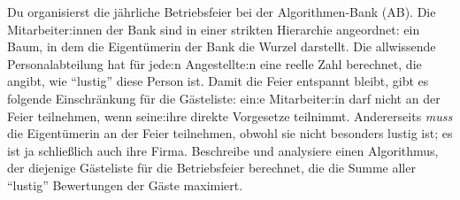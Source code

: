 \documentclass{uebung_cs}
\begin{document}
\begin{aufgabe}[Betriebsfeier]
    Du organisierst die jährliche Betriebsfeier bei der Algorithmen-Bank (AB).
    Die Mitarbeiter:innen der Bank sind in einer strikten Hierarchie angeordnet: ein Baum, in dem die Eigentümerin der Bank die Wurzel darstellt.
    Die allwissende Personalabteilung hat für jede:n Angestellte:n eine reelle Zahl berechnet, die angibt, wie \enquote{lustig} diese Person ist.
    Damit die Feier entspannt bleibt, gibt es folgende Einschränkung für die Gästeliste:
    ein:e Mitarbeiter:in darf nicht an der Feier teilnehmen, wenn seine:ihre direkte Vorgesetze teilnimmt.
    Andererseits \emph{muss} die Eigentümerin an der Feier teilnehmen, obwohl sie nicht besonders lustig ist; es ist ja schließlich auch ihre Firma.
    Beschreibe und analysiere einen Algorithmus, der diejenige Gästeliste für die Betriebsfeier berechnet, die die Summe aller \enquote{lustig} Bewertungen der Gäste maximiert.
\end{aufgabe}
\end{document}
